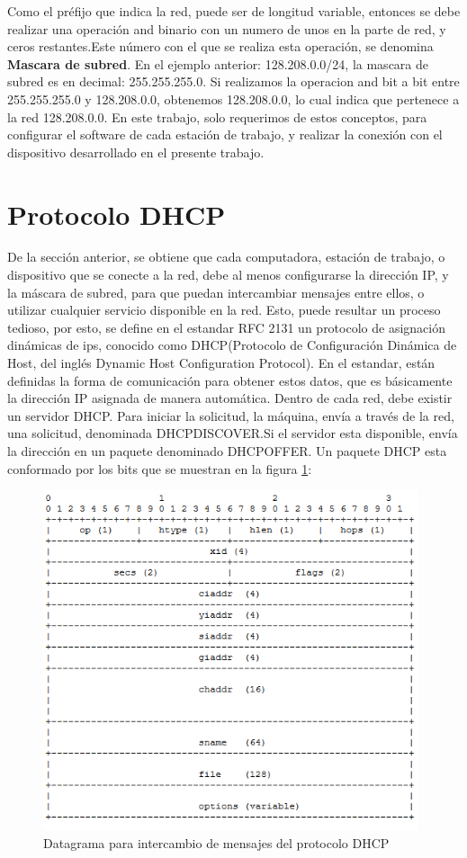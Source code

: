 Como el préfijo que indica la red, puede ser de longitud variable, entonces se debe realizar una operación and binario con un numero de unos en la parte de red, y ceros restantes.Este número con el que se realiza esta operación, se denomina \textbf{Mascara de subred}. En el ejemplo anterior: 128.208.0.0/24, la mascara de subred es en decimal: 255.255.255.0. Si realizamos la operacion and bit a bit entre 255.255.255.0 y 128.208.0.0, obtenemos 128.208.0.0, lo cual indica que pertenece a la red 128.208.0.0. En este trabajo, solo requerimos de estos conceptos, para configurar el software de cada estación de trabajo, y realizar la conexión con el dispositivo desarrollado en el presente trabajo.     
 
\section{Protocolo DHCP} 

De la sección anterior, se obtiene que cada computadora, estación de trabajo, o dispositivo que se conecte a la red, debe al menos configurarse la dirección IP, y la máscara de subred, para que puedan intercambiar mensajes entre ellos, o utilizar cualquier servicio disponible en la red. Esto, puede resultar un proceso tedioso, por esto, se define en el estandar RFC 2131 un protocolo de asignación dinámicas de ips, conocido como DHCP(Protocolo de Configuración Dinámica de Host,
del inglés Dynamic Host Configuration Protocol). En el estandar, están definidas la forma de comunicación para obtener estos datos, que es básicamente la dirección IP asignada de manera automática.  
Dentro de cada red, debe existir un servidor DHCP. Para iniciar la solicitud, la máquina, envía a través de la red, una solicitud, denominada DHCPDISCOVER.Si el servidor esta disponible, envía la dirección en un paquete denominado DHCPOFFER. 
Un paquete DHCP esta conformado por los bits que se muestran en la figura \ref{fig:pqdhcp}: 
\begin{figure}[ht]
	\includegraphics[width=\textwidth,height=10cm]{paqdhcp}
	\caption{Datagrama para intercambio de mensajes del protocolo DHCP}
	\label{fig:pqdhcp}
\end{figure} 

